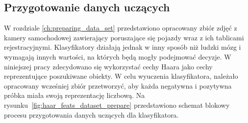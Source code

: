 \subsection{Przygotowanie danych uczących}
\label{subsec:przygotowanie-danych-uczacych}
W rozdziale \ref{ch:preparing_data_set} przedstawiono opracowany zbiór zdjęć z kamery samochodowej zawierający poruszające się pojazdy wraz z ich tablicami rejestracyjnymi.
Klasyfikatory działają jednak w inny sposób niż ludzki mózg i wymagają innych wartości, na których będą mogły podejmować decyzje.
W niniejszej pracy zdecydowano się wykorzystać cechy Haara jako cechy reprezentujące poszukiwane obiekty.
W celu wyuczenia klasyfikatora, należało opracowany wcześniej zbiór przetworzyć, aby każda negatywna i pozytywna próbka miała swoją reprezentację liczbową.
Na rysunku~\ref{fig:haar_feats_dataset_prepare} przedstawiono schemat blokowy procesu przygotowania danych uczących dla klasyfikatora.
